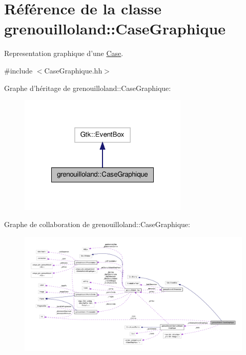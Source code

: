 \hypertarget{classgrenouilloland_1_1CaseGraphique}{\section{Référence de la classe grenouilloland\-:\-:Case\-Graphique}
\label{classgrenouilloland_1_1CaseGraphique}
}


Representation graphique d'une \hyperlink{classgrenouilloland_1_1Case}{Case}.  




{\ttfamily \#include $<$Case\-Graphique.\-hh$>$}



Graphe d'héritage de grenouilloland\-:\-:Case\-Graphique\-:
\nopagebreak
\begin{figure}[H]
\begin{center}
\leavevmode
\includegraphics[width=228pt]{classgrenouilloland_1_1CaseGraphique__inherit__graph}
\end{center}
\end{figure}


Graphe de collaboration de grenouilloland\-:\-:Case\-Graphique\-:
\nopagebreak
\begin{figure}[H]
\begin{center}
\leavevmode
\includegraphics[width=350pt]{classgrenouilloland_1_1CaseGraphique__coll__graph}
\end{center}
\end{figure}
